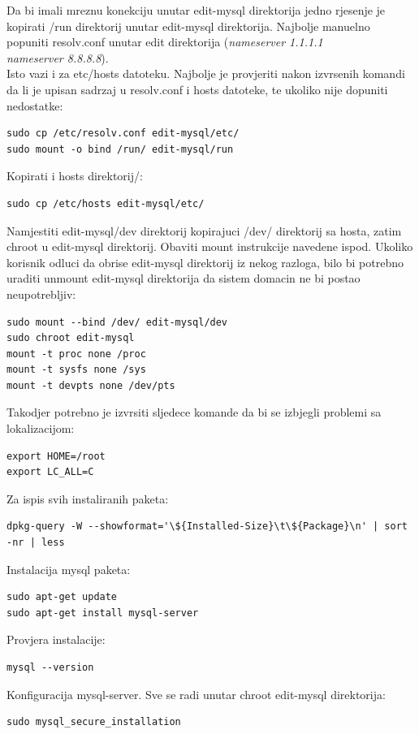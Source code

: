 \documentclass[12pt,vi]{mitthesis}
\begin{document}
\noindent
Da bi imali mreznu konekciju unutar edit-mysql direktorija jedno rjesenje je kopirati /run direktorij unutar edit-mysql direktorija.
Najbolje manuelno popuniti resolv.conf unutar edit direktorija (\textit{nameserver 1.1.1.1 \\
nameserver 8.8.8.8}).\\
Isto vazi i za etc/hosts datoteku. Najbolje je provjeriti nakon izvrsenih komandi da li je upisan sadrzaj u resolv.conf i hosts datoteke, te ukoliko nije dopuniti nedostatke:
\begin{lstlisting}[style=BashInputStyle]
sudo cp /etc/resolv.conf edit-mysql/etc/
sudo mount -o bind /run/ edit-mysql/run
\end{lstlisting}

\noindent
Kopirati i hosts direktorij/:
\begin{lstlisting}[style=BashInputStyle]
sudo cp /etc/hosts edit-mysql/etc/
\end{lstlisting}

\noindent
Namjestiti edit-mysql/dev direktorij kopirajuci /dev/ direktorij sa hosta, zatim chroot u edit-mysql direktorij.
Obaviti mount instrukcije navedene ispod. Ukoliko korisnik odluci da obrise edit-mysql direktorij iz nekog razloga,
bilo bi potrebno uraditi unmount edit-mysql direktorija da sistem domacin ne bi postao neupotrebljiv:
\begin{lstlisting}[style=BashInputStyle]
sudo mount --bind /dev/ edit-mysql/dev
sudo chroot edit-mysql
mount -t proc none /proc
mount -t sysfs none /sys
mount -t devpts none /dev/pts
\end{lstlisting}

\noindent
Takodjer potrebno je izvrsiti sljedece komande da bi se izbjegli problemi sa lokalizacijom:
\begin{lstlisting}[style=BashInputStyle]
export HOME=/root
export LC_ALL=C
\end{lstlisting}

\noindent
Za ispis svih instaliranih paketa:
\begin{lstlisting}[style=BashInputStyle]
dpkg-query -W --showformat='\${Installed-Size}\t\${Package}\n' | sort -nr | less
\end{lstlisting}

\noindent
Instalacija mysql paketa:
\begin{lstlisting}[style=BashInputStyle]
sudo apt-get update
sudo apt-get install mysql-server
\end{lstlisting}
Provjera instalacije:
\begin{lstlisting}[style=BashInputStyle]
mysql --version
\end{lstlisting}
Konfiguracija mysql-server. Sve se radi unutar chroot edit-mysql direktorija:
\begin{lstlisting}[style=BashInputStyle]
sudo mysql_secure_installation
\end{lstlisting}
\end{document}

